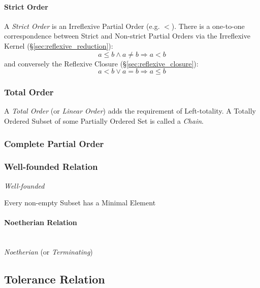\paragraph{Strict Order}\label{sec:strict_order}

A \emph{Strict Order} is an Irreflexive Partial Order (e.g. $<$).
There is a one-to-one correspondence between Strict and Non-strict
Partial Orders via the Irreflexive Kernel
(\S\ref{sec:reflexive_reduction}):
\[
  a \leq b \wedge a \neq b \Rightarrow a < b
\]
and conversely the Reflexive Closure (\S\ref{sec:reflexive_closure}):
\[
  a < b \vee a = b \Rightarrow a \leq b
\]



\subsubsection{Total Order}\label{sec:total_order}

A \emph{Total Order} (or \emph{Linear Order}) adds the requirement of
Left-totality. A Totally Ordered Subset of some Partially Ordered Set
is called a \emph{Chain}.



\subsubsection{Complete Partial Order}\label{sec:complete_partialorder}

\subsubsection{Well-founded Relation}\label{sec:well_founded}

\emph{Well-founded}

Every non-empty Subset has a Minimal Element



\paragraph{Noetherian Relation}\label{sec:noetherian_relation}
\hfill \\

\emph{Noetherian} (or \emph{Terminating})



\subsection{Tolerance Relation}\label{sec:tolerance_relation}

